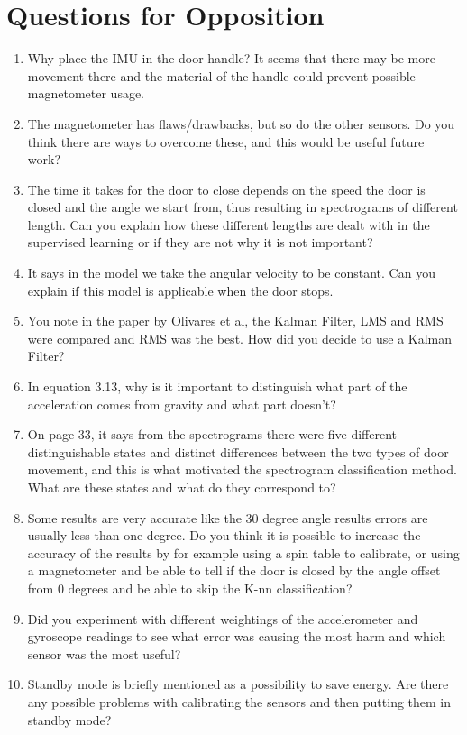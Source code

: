 \documentclass[12pt,a4paper]{report}
\begin{document}
\section{Questions for Opposition}
\begin{enumerate}
\item Why place the IMU in the door handle? It seems that there may be more movement there and the material of the handle could prevent possible magnetometer usage.

\item The magnetometer has flaws/drawbacks, but so do the other sensors. Do you think there are ways to overcome these, and this would be useful future work?

\item The time it takes for the door to close depends on the speed the door is closed and the angle we start from, thus resulting in spectrograms of different length. Can you explain how these different lengths are dealt with in the supervised learning or if they are not why it is not important?

\item It says in the model we take the angular velocity to be constant. Can you explain if this model is applicable when the door stops.

\item You note in the paper by Olivares et al, the Kalman Filter, LMS and RMS were compared and RMS was the best. How did you decide to use a Kalman Filter?

\item In equation 3.13, why is it important to distinguish what part of the acceleration comes from gravity and what part doesn't?

\item On page 33, it says from the spectrograms there were five different distinguishable states and distinct differences between the two types of door movement, and this is what motivated the spectrogram classification method. What are these states and what do they correspond to?

\item Some results are very accurate like the 30 degree angle results errors are usually less than one degree. Do you think it is possible to increase the accuracy of the results by for example using a spin table to calibrate, or using a magnetometer and be able to tell if the door is closed by the angle offset from 0 degrees and be able to skip the K-nn classification?

\item Did you experiment with different weightings of the accelerometer and gyroscope readings to see what error was causing the most harm and which sensor was the most useful? 

\item Standby mode is briefly mentioned as a possibility to save energy. Are there any possible problems with calibrating the sensors and then putting them in standby mode?
\end{enumerate}
\end{document}
